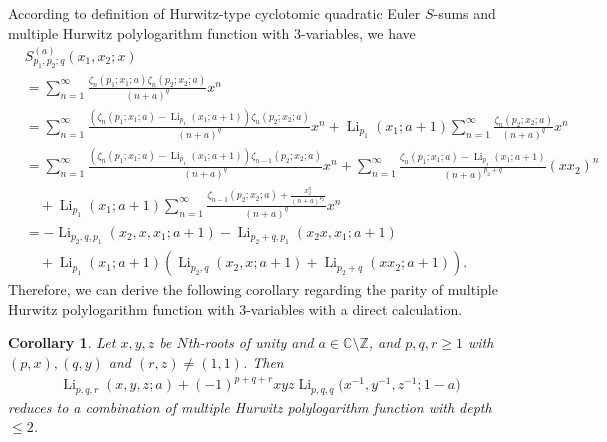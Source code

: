 \documentclass[11pt]{article}
\DeclareMathOperator{\Li}{Li}
\def\Z{\mathbb{Z}}
\theoremstyle{plain}
\newtheorem{cor}[thm]{Corollary}
\theoremstyle{definition}
\begin{document}
According to definition of Hurwitz-type cyclotomic quadratic Euler $S$-sums and multiple Hurwitz polylogarithm function with $3$-variables, we have
\begin{align*}
	&S^{(a)}_{p_1,p_2;q}(x_1,x_2;x)\\
	&=\sum_{n=1}^\infty\frac{\zeta_{n}(p_1;x_1;a)\zeta_{n}(p_2;x_2;a)}{(n+a)^q}x^n\\
	&=\sum_{n=1}^\infty\frac{(\zeta_{n}(p_1;x_1;a)-\Li_{p_1}(x_1;a+1))\zeta_{n}(p_2;x_2;a)}{(n+a)^q}x^n+\Li_{p_1}(x_1;a+1)\sum_{n=1}^\infty\frac{\zeta_{n}(p_2;x_2;a)}{(n+a)^q}x^n\\
	&=\sum_{n=1}^\infty\frac{(\zeta_{n}(p_1;x_1;a)-\Li_{p_1}(x_1;a+1))\zeta_{n-1}(p_2;x_2;a)}{(n+a)^q}x^n+\sum_{n=1}^\infty\frac{\zeta_{n}(p_1;x_1;a)-\Li_{p_1}(x_1;a+1)}{(n+a)^{p_2+q}}(xx_2)^n\\
	&\quad+\Li_{p_1}(x_1;a+1)\sum_{n=1}^\infty\frac{\zeta_{n-1}(p_2;x_2;a)+\frac{x_2^{n}}{(n+a)^{p_2}}}{(n+a)^q}x^n\\
	&=-\Li_{p_2,q,p_1}(x_2,x,x_1;a+1)-\Li_{p_2+q,p_1}(x_2x,x_1;a+1)\\
	&\quad+\Li_{p_1}(x_1;a+1)\left(\Li_{p_2,q}(x_2,x;a+1)+\Li_{p_2+q}(xx_2;a+1)\right).
\end{align*}
Therefore, we can derive the following corollary regarding the parity of multiple Hurwitz polylogarithm function with $3$-variables with a direct calculation.
\begin{cor}\label{thm-quadratic-CES-one-cor}Let $x,y,z$ be $N$th-roots of unity and $a\in \mathbb{C}\setminus \Z$, and $p,q,r \ge1$ with $(p,x),(q,y)$ and $(r,z)\ne(1,1)$. Then
	\begin{align*}
		\Li_{p,q,r}(x,y,z;a)	+(-1)^{p+q+r}xyz\Li_{p,q,q}\Big(x^{-1},y^{-1},z^{-1};1-a\Big)
	\end{align*}
reduces to a combination of multiple Hurwitz polylogarithm function with depth $\leq 2$.
\end{cor}
\end{document}
